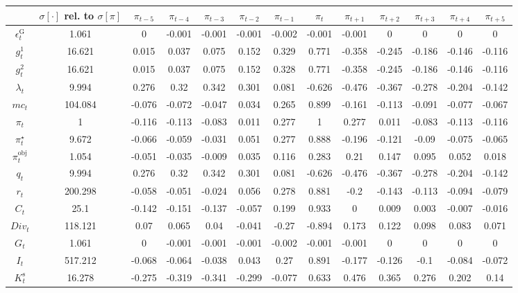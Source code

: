 \begin{tabular}{c|c|c|c|c|c|c|c|c|c|c|c|c|}
  & $\sigma[\cdot]$ rel. to $\sigma[\pi]$ & $\pi_{t-5}$ & $\pi_{t-4}$ & $\pi_{t-3}$ & $\pi_{t-2}$ & $\pi_{t-1}$ & $\pi_{t}$ & $\pi_{t+1}$ & $\pi_{t+2}$ & $\pi_{t+3}$ & $\pi_{t+4}$ & $\pi_{t+5}$\\
\hline
$\epsilon^{\mathrm{G}}_{t}$ & 1.061 & 0 & -0.001 & -0.001 & -0.001 & -0.002 & -0.001 & -0.001 & 0 & 0 & 0 & 0 \\
$g^{\mathrm{1}}_{t}$ & 16.621 & 0.015 & 0.037 & 0.075 & 0.152 & 0.329 & 0.771 & -0.358 & -0.245 & -0.186 & -0.146 & -0.116 \\
$g^{\mathrm{2}}_{t}$ & 16.621 & 0.015 & 0.037 & 0.075 & 0.152 & 0.328 & 0.771 & -0.358 & -0.245 & -0.186 & -0.146 & -0.116 \\
$\lambda_{t}$ & 9.994 & 0.276 & 0.32 & 0.342 & 0.301 & 0.081 & -0.626 & -0.476 & -0.367 & -0.278 & -0.204 & -0.142 \\
${m\!c}_{t}$ & 104.084 & -0.076 & -0.072 & -0.047 & 0.034 & 0.265 & 0.899 & -0.161 & -0.113 & -0.091 & -0.077 & -0.067 \\
$\pi_{t}$ & 1 & -0.116 & -0.113 & -0.083 & 0.011 & 0.277 & 1 & 0.277 & 0.011 & -0.083 & -0.113 & -0.116 \\
$\pi^{\star}_{t}$ & 9.672 & -0.066 & -0.059 & -0.031 & 0.051 & 0.277 & 0.888 & -0.196 & -0.121 & -0.09 & -0.075 & -0.065 \\
$\pi^{\mathrm{obj}}_{t}$ & 1.054 & -0.051 & -0.035 & -0.009 & 0.035 & 0.116 & 0.283 & 0.21 & 0.147 & 0.095 & 0.052 & 0.018 \\
$q_{t}$ & 9.994 & 0.276 & 0.32 & 0.342 & 0.301 & 0.081 & -0.626 & -0.476 & -0.367 & -0.278 & -0.204 & -0.142 \\
$r_{t}$ & 200.298 & -0.058 & -0.051 & -0.024 & 0.056 & 0.278 & 0.881 & -0.2 & -0.143 & -0.113 & -0.094 & -0.079 \\
$C_{t}$ & 25.1 & -0.142 & -0.151 & -0.137 & -0.057 & 0.199 & 0.933 & 0 & 0.009 & 0.003 & -0.007 & -0.016 \\
${D\!i\!v}_{t}$ & 118.121 & 0.07 & 0.065 & 0.04 & -0.041 & -0.27 & -0.894 & 0.173 & 0.122 & 0.098 & 0.083 & 0.071 \\
$G_{t}$ & 1.061 & 0 & -0.001 & -0.001 & -0.001 & -0.002 & -0.001 & -0.001 & 0 & 0 & 0 & 0 \\
$I_{t}$ & 517.212 & -0.068 & -0.064 & -0.038 & 0.043 & 0.27 & 0.891 & -0.177 & -0.126 & -0.1 & -0.084 & -0.072 \\
$K^{\mathrm{s}}_{t}$ & 16.278 & -0.275 & -0.319 & -0.341 & -0.299 & -0.077 & 0.633 & 0.476 & 0.365 & 0.276 & 0.202 & 0.14 \\

\end{tabular}
